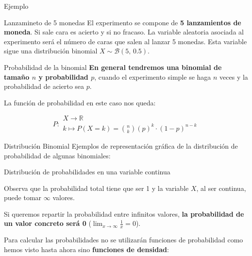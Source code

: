 \documentclass[11pt,handout]{beamer}
\begin{document}
\begin{frame}{Ejemplo}
\begin{block}{Lanzamineto de 5 monedas} El experimento se compone de \textbf{5 lanzamientos de moneda}. Si sale cara es acierto y si no fracaso. La variable aleatoria asociada al experimento será el número de caras que salen al lanzar 5 monedas. Esta variable sigue una distribución binomial $X \sim \mathcal{B}(5,\,0.5)$.
\end{block}



\end{frame}

\begin{frame}{Probabilidad de la binomial}
\textbf{En general tendremos una binomial de tamaño $n$ y probabilidad $p$}, cuando el experimento simple se haga $n$ veces y la probabilidad de acierto sea $p$.

La función de probabilidad en este caso nos queda:

\begin{block}{}
 $$P\colon \begin{array}{l} 
          X \rightarrow \mathbb{R} \\ 
          k\mapsto P(X=k)=\binom{n}{k}\left(p\right)^k\cdot  \left(1-p\right)^{n-k} 
         \end{array}$$

\end{block} 
    
\end{frame}

\begin{frame}{Distribución Binomial}
Ejemplos de representación gráfica de la distribución de probabilidad de algunas binomiales:    
         

    
\end{frame}


\begin{frame}{Distribución de probabilidades en una variable continua}

Observa que la probabilidad total tiene que ser 1 y la variable $X$, al ser continua, puede tomar $\infty$ valores.
\begin{block}{}
Si queremos repartir la probabilidad entre infinitos valores, \textbf{la probabilidad de un valor concreto será 0} ($\lim_{x \to \infty}\frac{1}{x}=0$). 
\end{block}
   

Para calcular las probabilidades no se utilizarán funciones de probabilidad como hemos visto hasta ahora sino \textbf{funciones de densidad}:
\end{frame}
\end{document}
